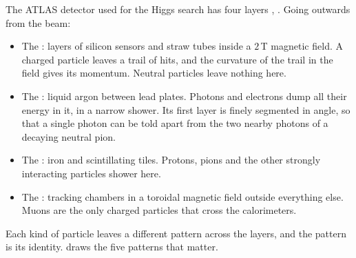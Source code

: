 The ATLAS detector used for the Higgs search has four layers \cite[Sec.~2]{AadHiggs2012}, \cite{ATLASDetector2008}. Going outwards from the beam:
\begin{itemize}[itemsep=1pt,leftmargin=1.2em]
  \item The : layers of silicon sensors and straw tubes inside a $2$\,T magnetic field. A charged particle leaves a trail of hits, and the curvature of the trail in the field gives its momentum. Neutral particles leave nothing here.
  \item The : liquid argon between lead plates. Photons and electrons dump all their energy in it, in a narrow shower. Its first layer is finely segmented in angle, so that a single photon can be told apart from the two nearby photons of a decaying neutral pion.
  \item The : iron and scintillating tiles. Protons, pions and the other strongly interacting particles shower here.
  \item The : tracking chambers in a toroidal magnetic field outside everything else. Muons are the only charged particles that cross the calorimeters.
\end{itemize}
Each kind of particle leaves a different pattern across the layers, and the pattern is its identity.  draws the five patterns that matter.

